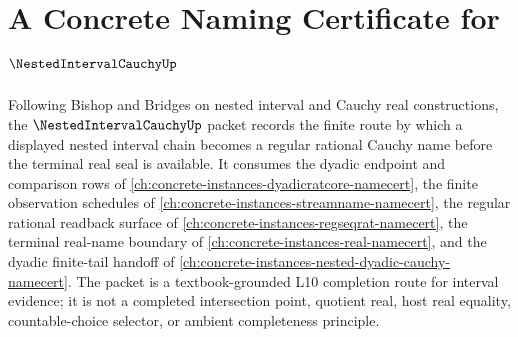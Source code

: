 \chapter{A Concrete Naming Certificate for $\NestedIntervalCauchyUp$}
\label{ch:concrete-instances-nested-interval-cauchy-namecert}

Following Bishop and Bridges on nested interval and Cauchy real constructions, the $\NestedIntervalCauchyUp$ packet records the finite route by which a displayed nested interval chain becomes a regular rational Cauchy name before the terminal real seal is available. It consumes the dyadic endpoint and comparison rows of \autoref{ch:concrete-instances-dyadicratcore-namecert}, the finite observation schedules of \autoref{ch:concrete-instances-streamname-namecert}, the regular rational readback surface of \autoref{ch:concrete-instances-regseqrat-namecert}, the terminal real-name boundary of \autoref{ch:concrete-instances-real-namecert}, and the dyadic finite-tail handoff of \autoref{ch:concrete-instances-nested-dyadic-cauchy-namecert}. The packet is a textbook-grounded L10 completion route for interval evidence; it is not a completed intersection point, quotient real, host real equality, countable-choice selector, or ambient completeness principle.

